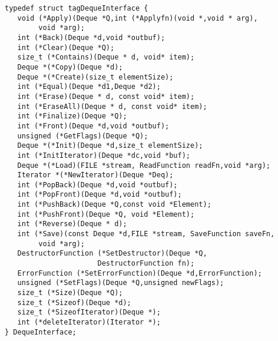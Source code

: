 \begin{verbatim}
typedef struct tagDequeInterface {
   void (*Apply)(Deque *Q,int (*Applyfn)(void *,void * arg),
        void *arg);
   int (*Back)(Deque *d,void *outbuf);
   int (*Clear)(Deque *Q);
   size_t (*Contains)(Deque * d, void* item);
   Deque *(*Copy)(Deque *d);
   Deque *(*Create)(size_t elementSize);
   int (*Equal)(Deque *d1,Deque *d2);
   int (*Erase)(Deque * d, const void* item);
   int (*EraseAll)(Deque * d, const void* item);
   int (*Finalize)(Deque *Q);
   int (*Front)(Deque *d,void *outbuf);
   unsigned (*GetFlags)(Deque *Q);
   Deque *(*Init)(Deque *d,size_t elementSize);
   int (*InitIterator)(Deque *dc,void *buf);
   Deque *(*Load)(FILE *stream, ReadFunction readFn,void *arg);
   Iterator *(*NewIterator)(Deque *Deq);
   int (*PopBack)(Deque *d,void *outbuf);
   int (*PopFront)(Deque *d,void *outbuf);
   int (*PushBack)(Deque *Q,const void *Element);
   int (*PushFront)(Deque *Q, void *Element);
   int (*Reverse)(Deque * d);
   int (*Save)(const Deque *d,FILE *stream, SaveFunction saveFn,
        void *arg);
   DestructorFunction (*SetDestructor)(Deque *Q,
                      DestructorFunction fn);
   ErrorFunction (*SetErrorFunction)(Deque *d,ErrorFunction);
   unsigned (*SetFlags)(Deque *Q,unsigned newFlags);
   size_t (*Size)(Deque *Q);
   size_t (*Sizeof)(Deque *d);
   size_t (*SizeofIterator)(Deque *);
   int (*deleteIterator)(Iterator *);
} DequeInterface;
\end{verbatim}
